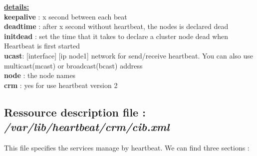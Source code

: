 \documentclass[a4paper,10pt]{report}
\begin{document}
\textbf{\underline{details:}}\\
\textbf{keepalive} : x second between each beat\\
\textbf{deadtime} : after x second without heartbeat, the nodes is declared dead\\
\textbf{initdead} : set the time that it takes to declare a cluster node dead when Heartbeat is first started\\
\textbf{ucast}: [interface] [ip node1] network for send/receive heartbeat. You can also use multicast(mcast) or broadcast(bcast) address\\
\textbf{node} : the node names\\
\textbf{crm} : yes for use heartbeat version 2\\


\subsection{Ressource description file : \textit{/var/lib/heartbeat/crm/cib.xml}}
This file specifies the services manage by heartbeat. We can find three sections :
\end{document}
